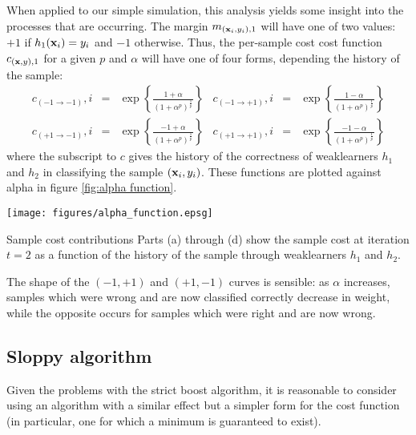 When applied to our simple simulation, this analysis yields some
insight into the processes that are occurring.  The margin
$m_{(\mathbf{x}_i, y_i), 1}$ will have one of two values: $+1$ if
$h_1(\mathbf{x}_i) = y_i$ and $-1$ otherwise.  Thus, the per-sample cost
cost function $c_{(\mathbf{x}, y), 1}$ for a given $p$ and $\alpha$ will
have one of four forms, depending the history of the sample:
%
\providecommand{\ra}{\rightarrow}
\providecommand{\Pn}{(1 + \alpha^p)^{\frac{1}{p}}}
\begin{equation}
\begin{array}{rclrcl}
c_(-1 \ra -1),i & = & \exp \left\{ \frac{ 1 + \alpha}{\Pn} \right\} &
c_(-1 \ra +1),i & = & \exp \left\{ \frac{ 1 - \alpha}{\Pn} \right\} \\
c_(+1 \ra -1),i & = & \exp \left\{ \frac{-1 + \alpha}{\Pn} \right\} &
c_(+1 \ra +1),i & = & \exp \left\{ \frac{-1 - \alpha}{\Pn} \right\}
\end{array}
\end{equation}
%
where the subscript to $c$ gives the history of the correctness of
weaklearners $h_1$ and $h_2$ in classifying the sample $(\mathbf{x}_i,
y_i)$.  These functions are plotted against alpha in figure
\ref{fig:alpha function}.

\begin{linefigure}
\begin{center}
\texttt{[image: figures/alpha\_function.epsg]}
\end{center}
\begin{capt}{Sample cost contributions}
Parts (a) through (d) show the sample cost at iteration $t=2$ as a
function of the history of the sample through weaklearners $h_1$ and
$h_2$.
\end{capt}
\end{linefigure}

The shape of the $(-1, +1)$ and $(+1, -1)$ curves is
sensible: as $\alpha$ increases, samples which were wrong and are now
classified correctly decrease in weight, while the opposite occurs for
samples which were right and are now wrong.


\subsection{Sloppy algorithm}

Given the problems with the strict boost algorithm, it is reasonable
to consider using an algorithm with a similar effect but a simpler
form for the cost function (in particular, one for which a minimum is
guaranteed to exist).


